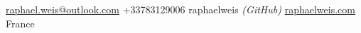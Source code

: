 \documentclass[10pt,a4paper]{article} %
\begin{document}


\noindent\href{mailto:raphael.weis@outlook.com}{raphael.weis@outlook.com}\bull %
+33783129006\bull
raphaelweis \textit{(GitHub)}\bull %
\href{https://raphaelweis.com}{raphaelweis.com}\bull %
France\\

\spacedhrule{0.9em}{-0.4em} %



%
%
%
%
\end{document}

